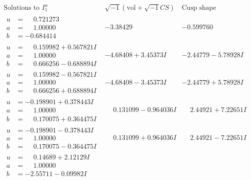 \documentclass[1p]{elsarticle_modified}
\theoremstyle{definition}
\newcommand{\I}{\sqrt{-1}}
\begin{document}
$$\begin{array}{c|c|c}  
\text{Solutions to }I^u_{1}& \I (\text{vol} + \sqrt{-1}CS) & \text{Cusp shape}\\
 \hline 
\begin{aligned}
u &= \phantom{-}0.721273\phantom{ +0.000000I} \\
a &= \phantom{-}1.00000\phantom{ +0.000000I} \\
b &= -0.684414\phantom{ +0.000000I}\end{aligned}
 & -3.38429\phantom{ +0.000000I} & -0.599760\phantom{ +0.000000I} \\ \hline\begin{aligned}
u &= \phantom{-}0.159982 + 0.567821 I \\
a &= \phantom{-}1.00000\phantom{ +0.000000I} \\
b &= \phantom{-}0.666256 - 0.688894 I\end{aligned}
 & -4.68408 + 3.45373 I & -2.44779 - 5.78928 I \\ \hline\begin{aligned}
u &= \phantom{-}0.159982 - 0.567821 I \\
a &= \phantom{-}1.00000\phantom{ +0.000000I} \\
b &= \phantom{-}0.666256 + 0.688894 I\end{aligned}
 & -4.68408 - 3.45373 I & -2.44779 + 5.78928 I \\ \hline\begin{aligned}
u &= -0.198901 + 0.378443 I \\
a &= \phantom{-}1.00000\phantom{ +0.000000I} \\
b &= \phantom{-}0.170075 + 0.364475 I\end{aligned}
 & \phantom{-}0.131099 - 0.964036 I & \phantom{-}2.44921 + 7.22651 I \\ \hline\begin{aligned}
u &= -0.198901 - 0.378443 I \\
a &= \phantom{-}1.00000\phantom{ +0.000000I} \\
b &= \phantom{-}0.170075 - 0.364475 I\end{aligned}
 & \phantom{-}0.131099 + 0.964036 I & \phantom{-}2.44921 - 7.22651 I \\ \hline\begin{aligned}
u &= \phantom{-}0.14689 + 2.12129 I \\
a &= \phantom{-}1.00000\phantom{ +0.000000I} \\
b &= -2.55711 - 0.09982 I\end{aligned}

\end{array}$$
\end{document}
